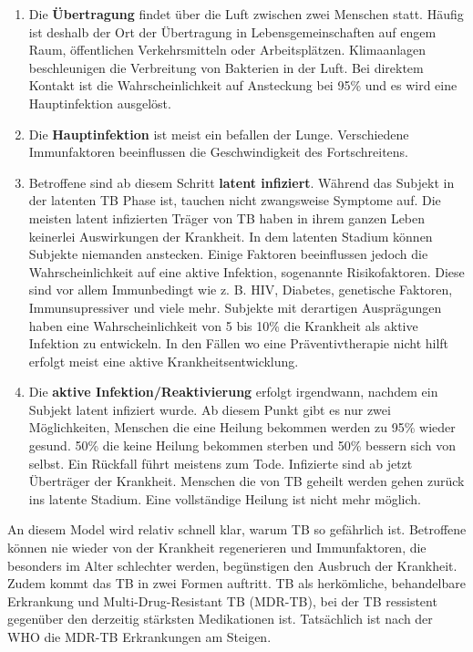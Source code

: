 \documentclass[paper=a4, fontsize=11pt, ngerman, abstract=on]{scrartcl}
\numberwithin{equation}{section} %
\numberwithin{figure}{section} %
\numberwithin{table}{section} %
\begin{document}
\begin{enumerate}
\item{Die \textbf{Übertragung} findet über die Luft zwischen zwei Menschen statt. Häufig ist deshalb der Ort der Übertragung in Lebensgemeinschaften auf engem Raum, öffentlichen Verkehrsmitteln oder Arbeitsplätzen. Klimaanlagen beschleunigen die Verbreitung von Bakterien in der Luft. Bei direktem Kontakt ist die Wahrscheinlichkeit auf Ansteckung bei 95\% und es wird eine Hauptinfektion ausgelöst.}
\item{Die \textbf{Hauptinfektion} ist meist ein befallen der Lunge. Verschiedene Immunfaktoren beeinflussen die Geschwindigkeit des Fortschreitens.}
\item{Betroffene sind ab diesem Schritt \textbf{latent infiziert}. Während das Subjekt in der latenten TB Phase ist, tauchen nicht zwangsweise Symptome auf. Die meisten latent infizierten Träger von TB haben in ihrem ganzen Leben keinerlei Auswirkungen der Krankheit. In dem latenten Stadium können Subjekte niemanden anstecken. Einige Faktoren beeinflussen jedoch die Wahrscheinlichkeit auf eine aktive Infektion, sogenannte Risikofaktoren. Diese sind vor allem Immunbedingt wie z. B. HIV, Diabetes, genetische Faktoren, Immunsupressiver und viele mehr. Subjekte mit derartigen Ausprägungen haben eine Wahrscheinlichkeit von 5 bis 10\% die Krankheit als aktive Infektion zu entwickeln. In den Fällen wo eine Präventivtherapie nicht hilft erfolgt meist eine aktive Krankheitsentwicklung.}
\item{Die \textbf{aktive Infektion/Reaktivierung} erfolgt irgendwann, nachdem ein Subjekt latent infiziert wurde. Ab diesem Punkt gibt es nur zwei Möglichkeiten, Menschen die eine Heilung bekommen werden zu 95\% wieder gesund. 50\% die keine Heilung bekommen sterben und 50\% bessern sich von selbst. Ein Rückfall führt meistens zum Tode. Infizierte sind ab jetzt Überträger der Krankheit. Menschen die von TB geheilt werden gehen zurück ins latente Stadium. Eine vollständige Heilung ist nicht mehr möglich.}
\end{enumerate}

An diesem Model wird relativ schnell klar, warum TB so gefährlich ist. Betroffene können nie wieder von der Krankheit regenerieren und Immunfaktoren, die besonders im Alter schlechter werden, begünstigen den Ausbruch der Krankheit. Zudem kommt das TB in zwei Formen auftritt. TB als herkömliche, behandelbare Erkrankung und Multi-Drug-Resistant TB (MDR-TB), bei der TB ressistent gegenüber den derzeitig stärksten Medikationen ist. Tatsächlich ist nach der WHO die MDR-TB Erkrankungen am Steigen.
\end{document}
